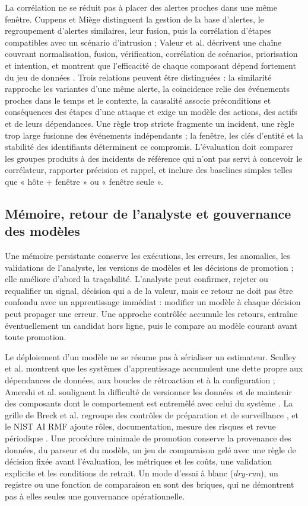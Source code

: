 La corrélation ne se réduit pas à placer des alertes proches dans une même fenêtre. Cuppens et Miège distinguent la gestion de la base d'alertes, le regroupement d'alertes similaires, leur fusion, puis la corrélation d'étapes compatibles avec un scénario d'intrusion \cite{cuppens2002alert} ; Valeur et al. décrivent une chaîne couvrant normalisation, fusion, vérification, corrélation de scénarios, priorisation et intention, et montrent que l'efficacité de chaque composant dépend fortement du jeu de données \cite{valeur2004correlation}. Trois relations peuvent être distinguées : la similarité rapproche les variantes d'une même alerte, la coïncidence relie des événements proches dans le temps et le contexte, la causalité associe préconditions et conséquences des étapes d'une attaque et exige un modèle des actions, des actifs et de leurs dépendances. Une règle trop stricte fragmente un incident, une règle trop large fusionne des événements indépendants ; la fenêtre, les clés d'entité et la stabilité des identifiants déterminent ce compromis. L'évaluation doit comparer les groupes produits à des incidents de référence qui n'ont pas servi à concevoir le corrélateur, rapporter précision et rappel, et inclure des baselines simples telles que « hôte + fenêtre » ou « fenêtre seule ».

\subsection{Mémoire, retour de l'analyste et gouvernance des modèles}

Une mémoire persistante conserve les exécutions, les erreurs, les anomalies, les validations de l'analyste, les versions de modèles et les décisions de promotion ; elle améliore d'abord la traçabilité. L'analyste peut confirmer, rejeter ou requalifier un signal, décision qui a de la valeur, mais ce retour ne doit pas être confondu avec un apprentissage immédiat : modifier un modèle à chaque décision peut propager une erreur. Une approche contrôlée accumule les retours, entraîne éventuellement un candidat hors ligne, puis le compare au modèle courant avant toute promotion.

Le déploiement d'un modèle ne se résume pas à sérialiser un estimateur. Sculley et al. montrent que les systèmes d'apprentissage accumulent une dette propre aux dépendances de données, aux boucles de rétroaction et à la configuration \cite{sculley2015debt} ; Amershi et al. soulignent la difficulté de versionner les données et de maintenir des composants dont le comportement est entremêlé avec celui du système \cite{amershi2019software}. La grille de Breck et al. regroupe des contrôles de préparation et de surveillance \cite{breck2017mltest}, et le NIST AI RMF ajoute rôles, documentation, mesure des risques et revue périodique \cite{nist2023airmf}. Une procédure minimale de promotion conserve la provenance des données, du parseur et du modèle, un jeu de comparaison gelé avec une règle de décision fixée avant l'évaluation, les métriques et les coûts, une validation explicite et les conditions de retrait. Un mode d'essai à blanc (\textit{dry-run}), un registre ou une fonction de comparaison en sont des briques, qui ne démontrent pas à elles seules une gouvernance opérationnelle.

